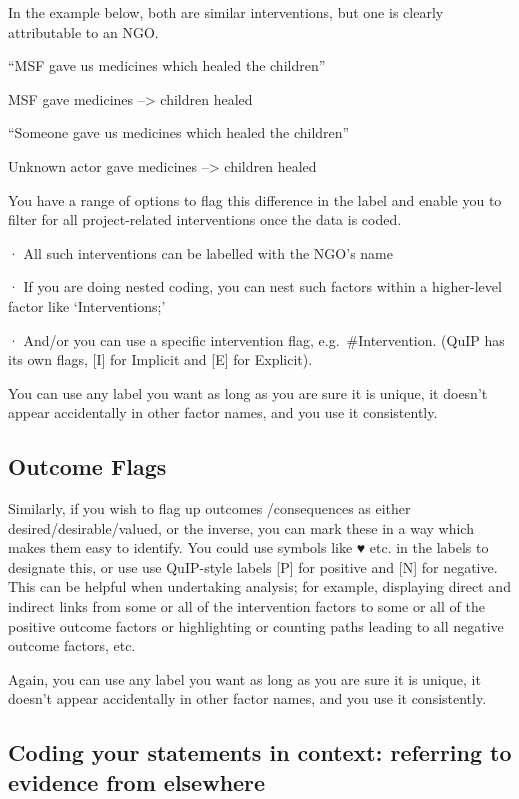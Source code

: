 \documentclass[
]{book}
\begin{document}
In the example below, both are similar interventions, but one is clearly attributable to an NGO.

``MSF gave us medicines which healed the children''

MSF gave medicines --\textgreater{} children healed

``Someone gave us medicines which healed the children''

Unknown actor gave medicines --\textgreater{} children healed

You have a range of options to flag this difference in the label and enable you to filter for all project-related interventions once the data is coded.

· All such interventions can be labelled with the NGO's name

· If you are doing nested coding, you can nest such factors within a higher-level factor like `Interventions;'

· And/or you can use a specific intervention flag, e.g.~\#Intervention. (QuIP has its own flags, {[}I{]} for Implicit and {[}E{]} for Explicit).

You can use any label you want as long as you are sure it is unique, it doesn't appear accidentally in other factor names, and you use it consistently.

\hypertarget{outcome-flags}{%
\subsection{Outcome Flags}\label{outcome-flags}}

Similarly, if you wish to flag up outcomes /consequences as either desired/desirable/valued, or the inverse, you can mark these in a way which makes them easy to identify. You could use symbols like ♥ etc. in the labels to designate this, or use use QuIP-style labels {[}P{]} for positive and {[}N{]} for negative. This can be helpful when undertaking analysis; for example, displaying direct and indirect links from some or all of the intervention factors to some or all of the positive outcome factors or highlighting or counting paths leading to all negative outcome factors, etc.

Again, you can use any label you want as long as you are sure it is unique, it doesn't appear accidentally in other factor names, and you use it consistently.

\hypertarget{coding-your-statements-in-context-referring-to-evidence-from-elsewhere}{%
\subsection{Coding your statements in context: referring to evidence from elsewhere}\label{coding-your-statements-in-context-referring-to-evidence-from-elsewhere}}
\end{document}
